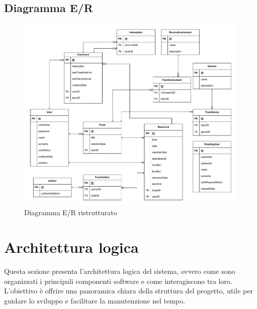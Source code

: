 \documentclass[a4paper]{article}
\begin{document}
\subsection{Diagramma E/R}
\begin{figure}[H]
    \centering
    \includegraphics[width=1.1 \textwidth]{./figures/diagramma_er_ristrutturato}
    \caption{Diagramma E/R ristrutturato}
    \label{fig:er_ristrutturato}
\end{figure}

\section{Architettura logica}
Questa sezione presenta l’architettura logica del sistema, ovvero come sono organizzati i principali componenti software e come interagiscono tra loro. L’obiettivo è offrire una panoramica chiara della struttura del progetto, utile per guidare lo sviluppo e facilitare la manutenzione nel tempo.
\end{document}
